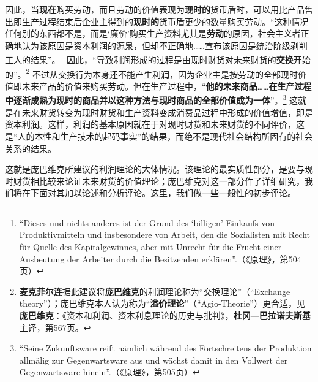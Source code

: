 \documentclass[fontset=fandol, a4paper, 12pt, openright]{ctexbook}
\begin{document}
因此，当\textbf{现在}购买劳动，而且劳动的价值表现为\textbf{现时的}货币盾时，可以用比产品售出即生产过程结束后企业主得到的\textbf{现时的}货币盾更少的数量购买劳动。“这种情况任何别的东西都不是，而是‘廉价’购买生产资料尤其是\textbf{劳动}的原因，社会主义者正确地认为该原因是资本利润的源泉，但却不正确地……宣布该原因是统治阶级剥削工人的结果”。\footnote{``Dieses und nichts anderes ist der Grund des `billigen' Einkaufs von Produktivmitteln und insbesondere von Arbeit, den die Sozialisten mit Recht f\"{u}r Quelle des Kapitalgewinnes, aber mit Unrecht f\"{u}r die Frucht einer Ausbeutung der Arbeiter durch die Besitzenden erkl\"{a}ren''.（《原理》，第504页）} 因此，“导致利润形成的过程是由现时财货对未来财货的\textbf{交换}开始的”。\footnote{\textbf{麦克菲尔连}据此建议将\textbf{庞巴维克}的利润理论称为“交换理论”（“Exchange theory”）；庞巴维克本人认为称为“\textbf{溢价理论}”（“Agio-Theorie”）更合适，见\textbf{庞巴维克}：《资本和利润、资本利息理论的历史与批判》，\textbf{杜冈}—\textbf{巴拉诺夫斯基}主译，第567页。} 不过从交换行为本身还不能产生利润，因为企业主是按劳动的全部现时价值即未来产品的价值来购买劳动。但在生产过程中，“\textbf{他的未来商品}……\textbf{在生产过程中逐渐成熟为现时的商品并以这种方法与现时商品的全部价值成为一体}”。\footnote{``Seine Zukunftsware reift n\"{a}mlich w\"{a}hrend des Fortschreitens der Produktion allm\"{a}lig zur Gegenwartsware aus und w\"{a}chst damit in den Vollwert der Gegenwartsware hinein''.（《原理》，第505页）} 这就是在未来财货转变为现时财货和生产资料变成消费品过程中形成的价值增值，即是资本利润。这样，利润的基本原因就在于对现时财货和未来财货的不同评价，这是“人的本性和生产技术的起码事实”的结果，而绝不是现代社会结构所固有的社会关系的结果。

这就是庞巴维克所建议的利润理论的大体情况。该理论的最实质性部分，是要与现时财货相比较来论证未来财货的价值理论；庞巴维克对这一部分作了详细研究，我们将在下面对其加以论述和分析评论。这里，我们做一些一般性的初步评论。
\end{document}
